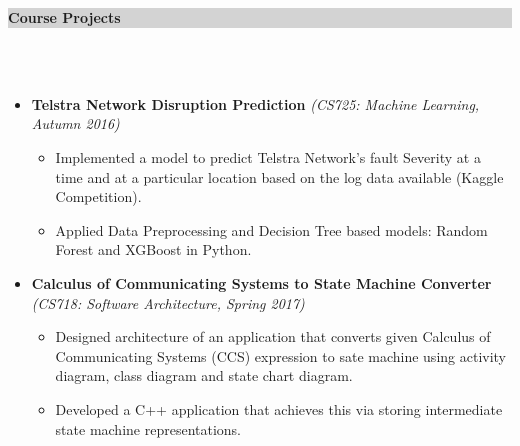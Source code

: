 \documentclass[a4paper,10pt]{article}
\newcommand{\lsep}{-0.5cm}
\newcommand{\hsep}{-0.6cm}
\newcommand{\resheading}[1]{{\small \colorbox{lightgray}{\begin{minipage}{0.975\textwidth}{\textbf{#1 \vphantom{p\^{E}}}}\end{minipage}}}}
\begin{document}



\resheading{\textbf{\large Course Projects}}\\[\lsep]
\\[-0.4cm]

\begin{itemize}

       
         \item \textbf{Telstra Network Disruption Prediction  } \hfill\emph{(CS725: Machine Learning, Autumn 2016)}  \\[\hsep]
        \begin{itemize}
	        \item Implemented a model to predict Telstra Network's fault Severity at a time and at a particular location based on the log data available (Kaggle Competition). \vspace{-0.1cm}
            \item Applied Data Preprocessing and Decision Tree based models: Random Forest and XGBoost in Python.  
        \end{itemize} 
      \vspace{-0.3cm}

     \newpage  
          
	
    \item \textbf{Calculus of Communicating Systems to State Machine Converter} \hfill \emph{(CS718: Software Architecture, Spring 2017)}	\\[\hsep]
        \begin{itemize}
        	\item Designed architecture of an application that converts given Calculus of Communicating Systems (CCS) expression to sate machine using activity diagram, class diagram and state chart diagram.
            \item Developed a C++ application that achieves this via storing intermediate state machine representations. 
        \end{itemize}
        \vspace{-0.3cm}
       


\end{itemize}
\end{document}

